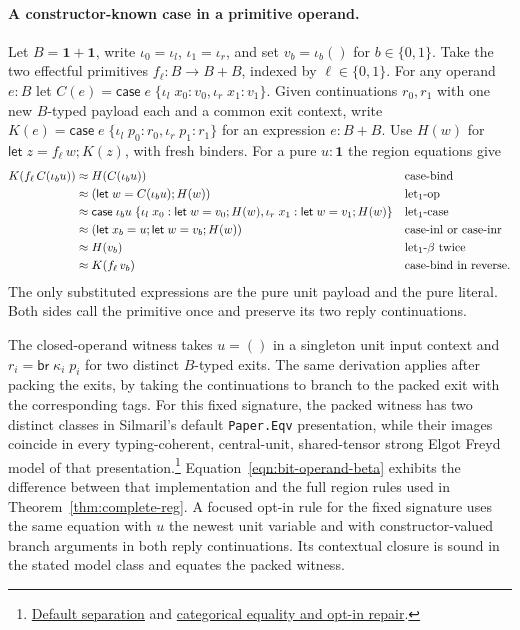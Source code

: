 \documentclass[acmsmall,screen,review]{acmart}
\newcommand{\mb}[1]{\ensuremath{\mathbf{#1}}}
\newcommand{\ms}[1]{\ensuremath{\mathsf{#1}}}
\newcommand{\lto}{:}
\newcommand{\linl}[1]{\iota_l\;{#1}}
\newcommand{\linr}[1]{\iota_r\;{#1}}
\newcommand{\caseexpr}[5]{\ms{case}\;#1\;\{\linl{#2} \lto #3, \linr{#4} \lto #5\}}
\newcommand{\letstmt}[3]{\ensuremath{\ms{let}\;#1 = #2; #3}}
\newcommand{\brb}[2]{\ms{br}\;#1\;#2}
\newcommand{\casestmt}[5]{\ms{case}\;#1\;\{\linl{#2} \lto #3, \linr{#4} \lto #5\}}
\newcommand{\teqv}{\approx}
\begin{document}
\paragraph{A constructor-known case in a primitive operand.}
Let $B=\mb{1}+\mb{1}$, write $\iota_0=\iota_l$, $\iota_1=\iota_r$, and set
$v_b=\iota_b()$ for $b\in\{0,1\}$. Take the two effectful primitives
$f_\ell:B\to B+B$, indexed by $\ell\in\{0,1\}$. For any operand $e:B$ let
$C(e)=\caseexpr{e}{x_0}{v_0}{x_1}{v_1}$.
Given continuations $r_0,r_1$ with one new $B$-typed payload each and a
common exit context, write $K(e)=\casestmt{e}{p_0}{r_0}{p_1}{r_1}$ for
an expression $e:B+B$. Use $H(w)$ for $\letstmt{z}{f_\ell\,w}{K(z)}$,
with fresh binders.
For a pure $u:\mb{1}$ the region equations give
\begin{align}
  K(f_\ell\,C(\iota_b u))
    &\teqv H(C(\iota_b u))
      && \text{case-bind} \notag\\
    &\teqv (\letstmt{w}{C(\iota_b u)}{H(w)})
      && \text{let$_1$-op} \notag\\
    &\teqv \casestmt{\iota_b u}{x_0}{\letstmt{w}{v_0}{H(w)}}
                            {x_1}{\letstmt{w}{v_1}{H(w)}}
      && \text{let$_1$-case} \notag\\
    &\teqv (\letstmt{x_b}{u}{\letstmt{w}{v_b}{H(w)}})
      && \text{case-inl or case-inr} \notag\\
    &\teqv H(v_b)
      && \text{let$_1$-$\beta$ twice} \notag\\
    &\teqv K(f_\ell\,v_b)
      && \text{case-bind in reverse}.
  \label{eqn:bit-operand-beta}
\end{align}
The only substituted expressions are the pure unit payload and the pure
literal. Both sides call the primitive once and preserve its two reply
continuations.

The closed-operand witness takes $u=()$ in a singleton unit input context
and $r_i=\brb{\kappa_i}{p_i}$ for two distinct $B$-typed exits.
The same derivation applies after packing the exits, by taking the
continuations to branch to the packed exit with the corresponding tags.
For this fixed signature, the packed witness has two distinct classes in
Silmaril's default \texttt{Paper.Eqv} presentation, while their images
coincide in every typing-coherent, central-unit, shared-tensor strong
Elgot Freyd model of that presentation.\footnote{
  \href{https://github.com/hiloopai/silmaril-lean/pull/4812}{Default separation}
  and
  \href{https://github.com/hiloopai/silmaril-lean/pull/4836}{categorical equality and opt-in repair}.
}
Equation~\eqref{eqn:bit-operand-beta} exhibits the difference between that
implementation and the full region rules used in
Theorem~\ref{thm:complete-reg}. A focused opt-in rule for the fixed signature
uses the same equation with $u$ the newest unit variable and with
constructor-valued branch arguments in both reply continuations. Its
contextual closure is sound in the stated model class and equates the
packed witness.
\end{document}
